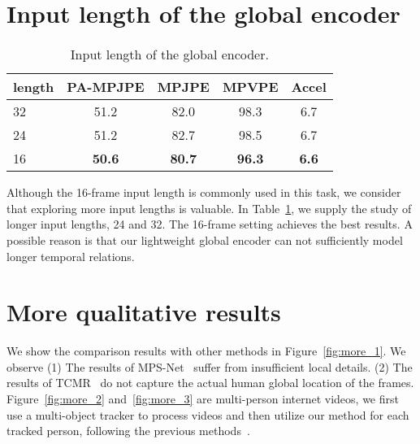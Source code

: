 \documentclass[10pt,twocolumn,letterpaper]{article}
\begin{document}
\section{Input length of the global encoder}
\begin{table}[htb]
	\small
	\vspace*{-1.5 em}
	\setlength{\tabcolsep}{6.5 pt}
	\begin{center}
		\begin{tabular}{l | c | c | c | c}
\toprule[2pt]
			\normalsize
			length & PA-MPJPE & MPJPE & MPVPE & Accel \\
			\midrule[1pt]
			32 & 51.2 & 82.0 & 98.3 & 6.7 \\
			\cellcolor{Gray}24 &
			\cellcolor{Gray}51.2 & \cellcolor{Gray}82.7 & \cellcolor{Gray}98.5 & \cellcolor{Gray}6.7 \\
			16 & \textbf{50.6} & \textbf{80.7} &
			\textbf{96.3} & 
			\textbf{6.6} \\
			\bottomrule[1pt]
\end{tabular}
	\end{center}
	\vspace*{-1.5 em}
	\caption{Input length of the global encoder.}
	\vspace*{-1. em}
	\label{input_length}
	
\end{table}


Although the 16-frame input length is commonly used in this task, we consider that exploring more input lengths is valuable.
In Table~\ref{input_length}, we supply the study of longer input lengths, 24 and 32.
The 16-frame setting achieves the best results. A possible reason is that our lightweight global encoder can not sufficiently model longer temporal relations. 




\section{More qualitative results}
We show the comparison results with other methods in Figure~\ref{fig:more_1}. We observe (1) The results of MPS-Net~\cite{MPS-net} suffer from insufficient local details. (2) The results of TCMR~\cite{TCMR} do not capture the actual human global location of the frames. Figure~\ref{fig:more_2} and~\ref{fig:more_3} are multi-person internet videos, we first use a multi-object tracker to process videos and then utilize our method for each tracked person, following the previous methods~\cite{TCMR, MPS-net}.
\end{document}
